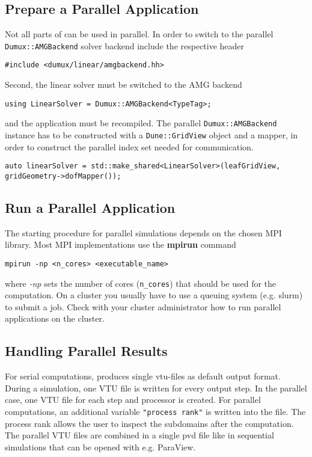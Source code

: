 \subsection{Prepare a Parallel Application}
Not all parts of \Dumux can be used in parallel. In order to switch to the parallel \texttt{Dumux::AMGBackend}
solver backend include the respective header

\begin{lstlisting}[style=DumuxCode]
#include <dumux/linear/amgbackend.hh>
\end{lstlisting}

Second, the linear solver must be switched to the AMG backend

\begin{lstlisting}[style=DumuxCode]
using LinearSolver = Dumux::AMGBackend<TypeTag>;
\end{lstlisting}

and the application must be recompiled. The parallel \texttt{Dumux::AMGBackend} instance has to be
constructed with a \texttt{Dune::GridView} object and a mapper, in order to construct the
parallel index set needed for communication.

\begin{lstlisting}[style=DumuxCode]
auto linearSolver = std::make_shared<LinearSolver>(leafGridView, gridGeometry->dofMapper());
\end{lstlisting}

\subsection{Run a Parallel Application}
The starting procedure for parallel simulations depends on the chosen MPI library.
Most MPI implementations use the \textbf{mpirun} command

\begin{lstlisting}[style=Bash]
mpirun -np <n_cores> <executable_name>
\end{lstlisting}

where \textit{-np} sets the number of cores (\texttt{n\_cores}) that should be used for the
computation. On a cluster you usually have to use a queuing system (e.g. slurm) to
submit a job. Check with your cluster administrator how to run parallel applications on the cluster.

\subsection{Handling Parallel Results}
For serial computations, \Dumux produces single vtu-files as default output format.
During a simulation, one VTU file is written for every output step.
In the parallel case, one VTU file for each step and processor is created.
For parallel computations, an additional variable \texttt{"process rank"} is written
into the file. The process rank allows the user to inspect the subdomains
after the computation. The parallel VTU files are combined in a single pvd file
like in sequential simulations that can be opened with e.g. ParaView.
